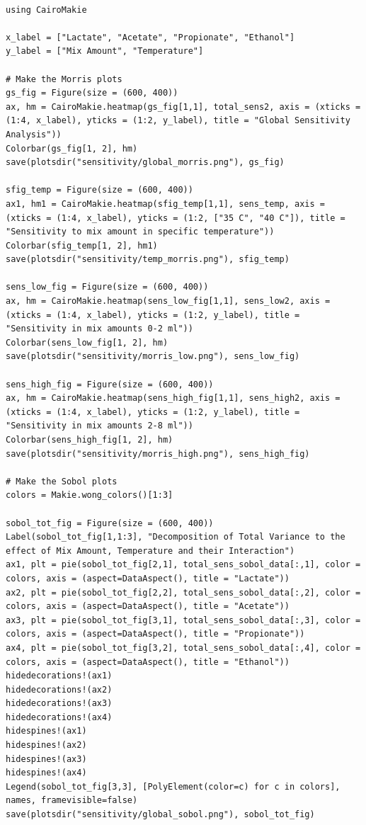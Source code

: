 \documentclass[11pt]{article}
\begin{document}
\begin{verbatim}

using CairoMakie

x_label = ["Lactate", "Acetate", "Propionate", "Ethanol"]
y_label = ["Mix Amount", "Temperature"]

# Make the Morris plots
gs_fig = Figure(size = (600, 400))
ax, hm = CairoMakie.heatmap(gs_fig[1,1], total_sens2, axis = (xticks = (1:4, x_label), yticks = (1:2, y_label), title = "Global Sensitivity Analysis"))
Colorbar(gs_fig[1, 2], hm)
save(plotsdir("sensitivity/global_morris.png"), gs_fig)

sfig_temp = Figure(size = (600, 400))
ax1, hm1 = CairoMakie.heatmap(sfig_temp[1,1], sens_temp, axis = (xticks = (1:4, x_label), yticks = (1:2, ["35 C", "40 C"]), title = "Sensitivity to mix amount in specific temperature"))
Colorbar(sfig_temp[1, 2], hm1)
save(plotsdir("sensitivity/temp_morris.png"), sfig_temp)

sens_low_fig = Figure(size = (600, 400))
ax, hm = CairoMakie.heatmap(sens_low_fig[1,1], sens_low2, axis = (xticks = (1:4, x_label), yticks = (1:2, y_label), title = "Sensitivity in mix amounts 0-2 ml"))
Colorbar(sens_low_fig[1, 2], hm)
save(plotsdir("sensitivity/morris_low.png"), sens_low_fig)

sens_high_fig = Figure(size = (600, 400))
ax, hm = CairoMakie.heatmap(sens_high_fig[1,1], sens_high2, axis = (xticks = (1:4, x_label), yticks = (1:2, y_label), title = "Sensitivity in mix amounts 2-8 ml"))
Colorbar(sens_high_fig[1, 2], hm)
save(plotsdir("sensitivity/morris_high.png"), sens_high_fig)

# Make the Sobol plots
colors = Makie.wong_colors()[1:3]

sobol_tot_fig = Figure(size = (600, 400))
Label(sobol_tot_fig[1,1:3], "Decomposition of Total Variance to the effect of Mix Amount, Temperature and their Interaction")
ax1, plt = pie(sobol_tot_fig[2,1], total_sens_sobol_data[:,1], color = colors, axis = (aspect=DataAspect(), title = "Lactate"))
ax2, plt = pie(sobol_tot_fig[2,2], total_sens_sobol_data[:,2], color = colors, axis = (aspect=DataAspect(), title = "Acetate"))
ax3, plt = pie(sobol_tot_fig[3,1], total_sens_sobol_data[:,3], color = colors, axis = (aspect=DataAspect(), title = "Propionate"))
ax4, plt = pie(sobol_tot_fig[3,2], total_sens_sobol_data[:,4], color = colors, axis = (aspect=DataAspect(), title = "Ethanol"))
hidedecorations!(ax1)
hidedecorations!(ax2)
hidedecorations!(ax3)
hidedecorations!(ax4)
hidespines!(ax1)
hidespines!(ax2)
hidespines!(ax3)
hidespines!(ax4)
Legend(sobol_tot_fig[3,3], [PolyElement(color=c) for c in colors], names, framevisible=false)
save(plotsdir("sensitivity/global_sobol.png"), sobol_tot_fig)


\end{verbatim}
\end{document}
